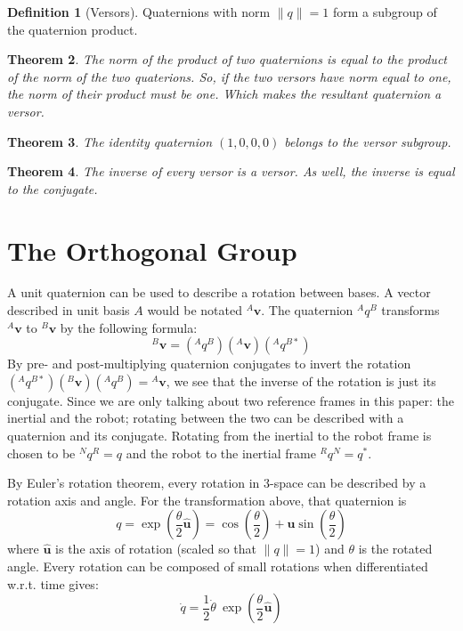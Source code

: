 \documentclass{amsart}
\newtheorem{theorem}{Theorem}[section]
\theoremstyle{definition}
\newtheorem{definition}[theorem]{Definition}
\theoremstyle{remark}
\numberwithin{equation}{section}
\begin{document}
\begin{definition}[Versors]
  Quaternions with norm $\|q\|=1$ form a subgroup of the quaternion product.
\end{definition}

\begin{theorem}
  The norm of the product of two quaternions is equal to the product of the norm of the two quaterions. So, if the two versors have norm equal to one, the norm of their product must be one. Which makes the resultant quaternion a versor.
\end{theorem}

\begin{theorem}
  The identity quaternion $(1, 0, 0, 0)$ belongs to the versor subgroup.
\end{theorem}

\begin{theorem}
  The inverse of every versor is a versor. As well, the inverse is equal to the conjugate.
\end{theorem}


\section{The Orthogonal Group}
A unit quaternion can be used to describe a rotation between bases. A vector described in unit basis $A$ would be notated $^A\mathbf{v}$. The quaternion $^Aq^B$ transforms $^A\mathbf{v}$ to $^B\mathbf{v}$ by the following formula:
\begin{equation}
  {^B\mathbf{v}} = \left({^Aq^B}\right)\left( {^A\mathbf{v}}\right)\left( {^Aq^{B*}}\right)
\end{equation}
By pre- and post-multiplying quaternion conjugates to invert the rotation $\left({^Aq^{B*}}\right)\left({^B\mathbf{v}}\right)\left({^Aq^B}\right)={^A\mathbf{v}}$, we see that the inverse of the rotation is just its conjugate. Since we are only talking about two reference frames in this paper: the inertial and the robot; rotating between the two can be described with a quaternion and its conjugate. Rotating from the inertial to the robot frame is chosen to be ${^Nq^R}=q$ and the robot to the inertial frame ${^Rq^N}=q^*$.

By Euler's rotation theorem, every rotation in 3-space can be described by a rotation axis and angle. For the transformation above, that quaternion is
\begin{equation}
  q = \exp\left(\frac{\theta}{2}\hat{\mathbf{u}}\right) = \cos\left(\frac{\theta}{2}\right) + \mathbf{u} \sin\left( \frac{\theta}{2}\right)
\end{equation}
where $\hat{\mathbf{u}}$ is the axis of rotation (scaled so that $\|q\|=1$) and $\theta$ is the rotated angle. Every rotation can be composed of small rotations when differentiated w.r.t. time gives:
\begin{equation}
  \dot{q} = \frac{1}{2} \dot{\theta} \ \exp\left(\frac{\theta}{2} \hat{\mathbf{u}} \right)
\end{equation}
\end{document}
